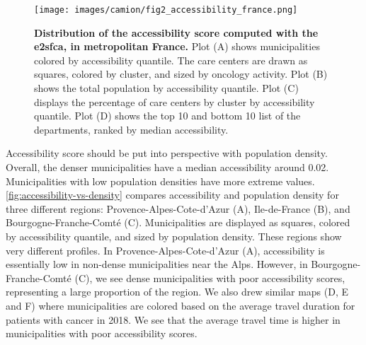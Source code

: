 \begin{figure}[H]
    \texttt{[image: images/camion/fig2\_accessibility\_france.png]}
    \centering
    \caption{
        \textbf{Distribution of the accessibility score computed with the \ac{e2sfca}, in metropolitan France.} Plot (A) shows municipalities colored by accessibility quantile. The care centers are drawn as squares, colored by cluster, and sized by oncology activity. Plot (B) shows the total population by accessibility quantile. Plot (C) displays the percentage of care centers by cluster by accessibility quantile. Plot (D) shows the top 10 and bottom 10 list of the departments, ranked by median accessibility.
    }
    \label{fig:accessibility-france}
\end{figure}

Accessibility score should be put into perspective with population density. Overall, the denser municipalities have a median accessibility around 0.02. Municipalities with low population densities have more extreme values.  \cref{fig:accessibility-vs-density} compares accessibility and population density for three different regions: Provence-Alpes-Cote-d'Azur (A), Ile-de-France (B), and Bourgogne-Franche-Comté (C). Municipalities are displayed as squares, colored by accessibility quantile, and sized by population density. These regions show very different profiles. In Provence-Alpes-Cote-d'Azur (A), accessibility is essentially low in non-dense municipalities near the Alps. However, in Bourgogne-Franche-Comté (C), we see dense municipalities with poor accessibility scores, representing a large proportion of the region. We also drew similar maps (D, E and F) where municipalities are colored based on the average travel duration for patients with cancer in 2018. We see that the average travel time is higher in municipalities with poor accessibility scores.

